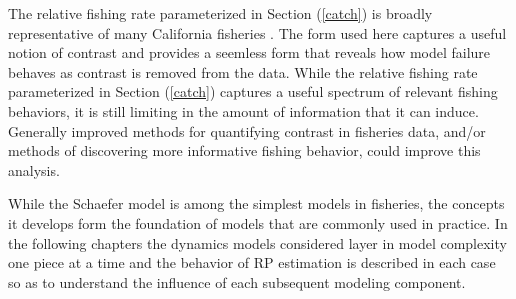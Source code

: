 %
The relative fishing rate parameterized in Section (\ref{catch}) is broadly 
representative of many California fisheries \cite{pearson_effectiveness_1995, pearson_reliability_2008}. 
The form used here captures a useful notion of contrast and provides a seemless 
form that reveals how model failure behaves as contrast is removed from the 
data. 
%
While the relative fishing rate parameterized in Section (\ref{catch}) captures a useful
spectrum of relevant fishing behaviors, it is still limiting in the amount of information
that it can induce.
Generally improved methods for quantifying contrast in fisheries 
data, and/or methods of discovering more informative fishing behavior, could 
improve this analysis.

%
While the Schaefer model is among the simplest models in fisheries, the concepts 
it develops form the foundation of models that are commonly used in practice. 
In the following chapters the dynamics models considered layer in model 
complexity one piece at a time and the behavior of RP estimation is described 
in each case so as to understand the influence of each subsequent modeling 
component. 

%

%


